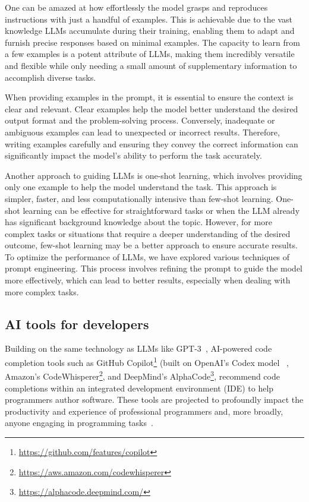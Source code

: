 One can be amazed at how effortlessly the model grasps and reproduces instructions with just a handful of examples. This is achievable due to the vast knowledge LLMs accumulate during their training, enabling them to adapt and furnish precise responses based on minimal examples. The capacity to learn from a few examples is a potent attribute of LLMs, making them incredibly versatile and flexible while only needing a small amount of supplementary information to accomplish diverse tasks.

When providing examples in the prompt, it is essential to ensure the context is clear and relevant. Clear examples help the model better understand the desired output format and the problem-solving process. Conversely, inadequate or ambiguous examples can lead to unexpected or incorrect results. Therefore, writing examples carefully and ensuring they convey the correct information can significantly impact the model's ability to perform the task accurately.

Another approach to guiding LLMs is one-shot learning, which involves providing only one example to help the model understand the task. This approach is simpler, faster, and less computationally intensive than few-shot learning. One-shot learning can be effective for straightforward tasks or when the LLM already has significant background knowledge about the topic. However, for more complex tasks or situations that require a deeper understanding of the desired outcome, few-shot learning may be a better approach to ensure accurate results.
To optimize the performance of LLMs, we have explored various techniques of prompt engineering. This process involves refining the prompt to guide the model more effectively, which can lead to better results, especially when dealing with more complex tasks. 

\subsection{AI tools for developers}
Building on the same technology as LLMs like GPT-3~\cite{Brown2020}, AI-powered code completion tools such as GitHub Copilot\footnote{\url{https://github.com/features/copilot}} (built on OpenAI’s Codex model ~\cite{MarkChen2021}, Amazon’s CodeWhisperer\footnote{\url{https://aws.amazon.com/codewhisperer}}, and DeepMind’s AlphaCode\footnote{\url{https://alphacode.deepmind.com/}}, recommend code completions within an integrated development environment (IDE) to help programmers author software. These tools are projected to profoundly impact the productivity and experience of professional programmers and, more broadly, anyone engaging in programming tasks~\cite{Ziegler2022productivity}.

